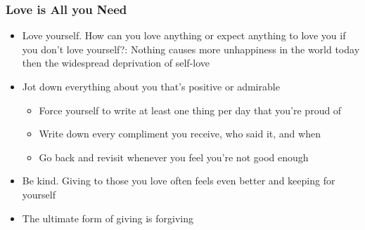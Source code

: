 \begin{frame}[fragile]\frametitle{Love is All you Need}
\begin{itemize}
\item Love yourself. How can you love anything or expect anything to love you if you don’t love yourself?: Nothing causes more unhappiness in the world today then the widespread deprivation of self-love
\item Jot down everything about you that’s positive or admirable
	\begin{itemize}
	\item Force yourself to write at least one thing per day that you’re proud of
	\item Write down every compliment you receive, who said it, and when
	\item Go back and revisit whenever you feel you’re not good enough
	\end{itemize}

\item Be kind. Giving to those you love often feels even better and keeping for yourself
\item The ultimate form of giving is forgiving
\end{itemize}

\end{frame}

